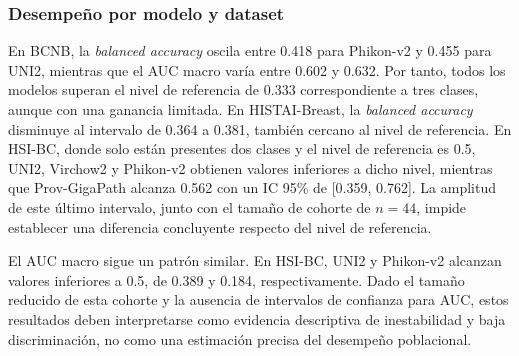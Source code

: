 \subsubsection{Desempeño por modelo y dataset}


En BCNB, la \textit{balanced accuracy} oscila entre 0.418 para Phikon-v2 y 0.455 para UNI2, mientras que el AUC macro varía entre 0.602 y 0.632. Por tanto, todos los modelos superan el nivel de referencia de 0.333 correspondiente a tres clases, aunque con una ganancia limitada. En HISTAI-Breast, la \textit{balanced accuracy} disminuye al intervalo de 0.364 a 0.381, también cercano al nivel de referencia. En HSI-BC, donde solo están presentes dos clases y el nivel de referencia es 0.5, UNI2, Virchow2 y Phikon-v2 obtienen valores inferiores a dicho nivel, mientras que Prov-GigaPath alcanza 0.562 con un IC 95\% de [0.359, 0.762]. La amplitud de este último intervalo, junto con el tamaño de cohorte de $n=44$, impide establecer una diferencia concluyente respecto del nivel de referencia.

El AUC macro sigue un patrón similar. En HSI-BC, UNI2 y Phikon-v2 alcanzan valores inferiores a 0.5, de 0.389 y 0.184, respectivamente. Dado el tamaño reducido de esta cohorte y la ausencia de intervalos de confianza para AUC, estos resultados deben interpretarse como evidencia descriptiva de inestabilidad y baja discriminación, no como una estimación precisa del desempeño poblacional.

